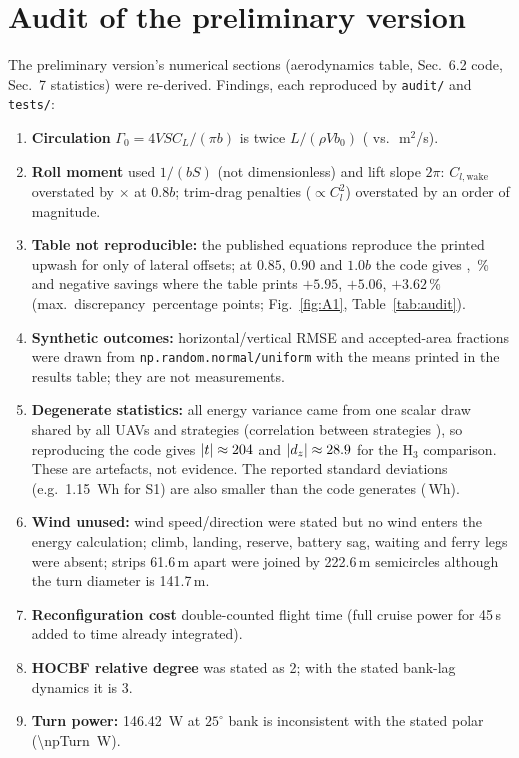 \documentclass[preprint,12pt]{elsarticle}
\begin{document}
\appendix
\renewcommand{\theHfigure}{A.\arabic{figure}}\renewcommand{\theHtable}{A.\arabic{table}}
\setcounter{figure}{0}\setcounter{table}{0}
\section{Audit of the preliminary version}\label{app:audit}
The preliminary version's numerical sections (aerodynamics table, Sec.~6.2 code, Sec.~7 statistics) were re-derived. Findings, each reproduced by \texttt{audit/} and \texttt{tests/}:
\begin{enumerate}\small
\item \textbf{Circulation} $\Gamma_0=4VSC_L/(\pi b)$ is twice $L/(\rho Vb_0)$ (\ngammaPub{} vs.\ \ngammaTrue\,m$^2$/s).
\item \textbf{Roll moment} used $1/(bS)$ (not dimensionless) and lift slope $2\pi$: $C_{l,\mathrm{wake}}$ overstated by \nclPubOverCorr$\times$ at $0.8b$; trim-drag penalties ($\propto C_l^2$) overstated by an order of magnitude.
\item \textbf{Table not reproducible:} the published equations reproduce the printed upwash for only \nnTabMatch{} of \nnTabAll{} lateral offsets; at $0.85$, $0.90$ and $1.0b$ the code gives \npubAtEightyFive, \npubDropNinety\,\% and negative savings where the table prints $+5.95$, $+5.06$, $+3.62$\,\% (max.\ discrepancy \nauditMaxPctErr\,percentage points; Fig.~\ref{fig:A1}, Table~\ref{tab:audit}).
\item \textbf{Synthetic outcomes:} horizontal/vertical RMSE and accepted-area fractions were drawn from \texttt{np.random.normal/uniform} with the means printed in the results table; they are not measurements.
\item \textbf{Degenerate statistics:} all energy variance came from one scalar draw shared by all UAVs and strategies (correlation between strategies \nauditCorr), so reproducing the code gives $|t|\approx204$ and $|d_z|\approx28.9$ for the H$_3$ comparison. These are artefacts, not evidence. The reported standard deviations (e.g.\ \SI{1.15}{Wh} for S1) are also smaller than the code generates (\nauditEoneSD\,Wh).
\item \textbf{Wind unused:} wind speed/direction were stated but no wind enters the energy calculation; climb, landing, reserve, battery sag, waiting and ferry legs were absent; strips 61.6\,m apart were joined by 222.6\,m semicircles although the turn diameter is 141.7\,m.
\item \textbf{Reconfiguration cost} double-counted flight time (full cruise power for 45\,s added to time already integrated).
\item \textbf{HOCBF relative degree} was stated as 2; with the stated bank-lag dynamics it is 3.
\item \textbf{Turn power:} \SI{146.42}{W} at $25^\circ$ bank is inconsistent with the stated polar (\SI{\npTurn}{W}).
\end{enumerate}
\end{document}
